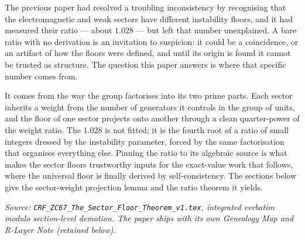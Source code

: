 \documentclass[12pt, a4paper]{article}
\begin{document}
The previous paper had resolved a troubling inconsistency by recognising that
the electromagnetic and weak sectors have different instability floors, and it
had measured their ratio --- about $1.028$ --- but left that number unexplained.
A bare ratio with no derivation is an invitation to suspicion: it could be a
coincidence, or an artifact of how the floors were defined, and until its
origin is found it cannot be trusted as structure. The question this paper
answers is where that specific number comes from.

It comes from the way the group factorises into its two prime parts. Each
sector inherits a weight from the number of generators it controls in the group
of units, and the floor of one sector projects onto another through a clean
quarter-power of the weight ratio. The $1.028$ is not fitted; it is the
fourth root of a ratio of small integers dressed by the instability parameter,
forced by the same factorisation that organises everything else. Pinning the
ratio to its algebraic source is what makes the sector floors trustworthy
inputs for the exact-value work that follows, where the universal floor is
finally derived by self-consistency. The sections below give the sector-weight
projection lemma and the ratio theorem it yields.
\label{sec:zc67}

\noindent
\textit{Source: \texttt{CRF\_ZC67\_The\_Sector\_Floor\_Theorem\_v1.tex}, integrated verbatim modulo
section-level demotion. The paper ships with its own Genealogy Map
and R-Layer Note (retained below).}

\medskip

\sloppy

\end{document}
